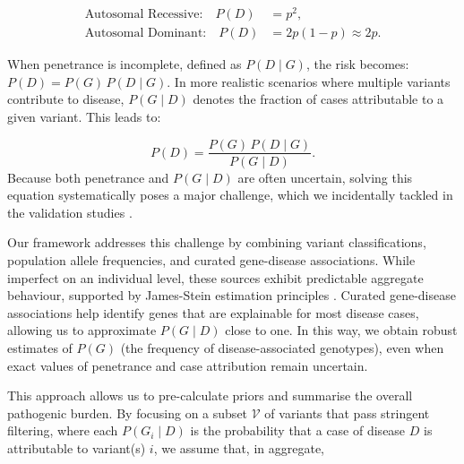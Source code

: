 \[
\begin{aligned}
\text{Autosomal Recessive:} \quad P(D) &= p^2, \\
\text{Autosomal Dominant:} \quad P(D) &= 2p(1-p) \approx 2p.
\end{aligned}
\]

When penetrance is incomplete, defined as \(P(D\mid G)\), the risk becomes:
$P(D) = P(G)\,P(D\mid G).$
In more realistic scenarios where multiple variants contribute to disease, \(P(G\mid D)\) denotes the fraction of cases attributable to a given variant. This leads to:

\[
P(D) = \frac{P(G)\,P(D\mid G)}{P(G\mid D)}.
\]
Because both penetrance and \(P(G\mid D)\) are often uncertain, solving this equation systematically poses a major challenge, which we incidentally tackled in the validation studies
\cite{minikel_quantifying_2016, whiffin_using_2017}. %

Our framework addresses this challenge by combining variant classifications, population allele frequencies, and curated gene-disease associations. 
While imperfect on an individual level, these sources exhibit predictable aggregate behaviour, supported by James-Stein estimation principles \cite{efron_steins_1973}.
Curated gene-disease associations help identify genes that are explainable for most disease cases, allowing us to approximate \(P(G\mid D)\) close to one. In this way, we obtain robust estimates of \(P(G)\) (the frequency of disease-associated genotypes), even when exact values of penetrance and case attribution remain uncertain.

This approach allows us to pre-calculate priors and summarise the overall pathogenic burden.
By focusing on a subset \(\mathcal{V}\) of variants that pass stringent filtering, where each \(P(G_i \mid D)\) is the probability that a case of disease \(D\) is attributable to variant(s) \(i\), we assume that, in aggregate,

